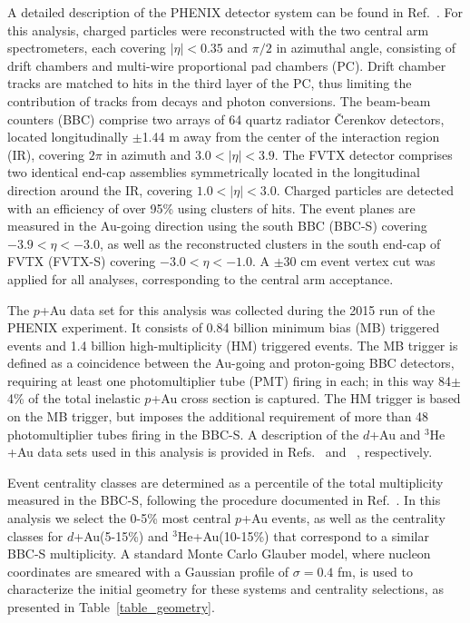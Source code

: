 \documentclass[%
reprint,
showpacs,preprintnumbers,
 amsmath,amssymb,
 aps,
]{revtex4-1}
\newcommand{\dau}{\mbox{$d$+Au}\xspace}
\newcommand{\pau}{\mbox{$p$+Au}\xspace}
\newcommand{\hau}{\mbox{$^3\text{He}$+Au}\xspace}
\newcommand{\bbceta}{\mbox{$3.0<|\eta|<3.9$}\xspace}
\begin{document}
A detailed description of the PHENIX detector system can be found in Ref.~\cite{Adcox2003469}. For this analysis, charged particles were reconstructed with the two central arm spectrometers, each covering $|\eta|<0.35$ and $\pi/2$ in azimuthal angle, consisting of drift chambers and multi-wire proportional pad chambers (PC). Drift chamber tracks are matched to hits in the third layer of the PC, thus limiting the contribution of tracks from decays and photon conversions. The beam-beam counters (BBC) comprise two arrays of 64 quartz radiator \v{C}erenkov detectors, located longitudinally $\pm$1.44 m away from the center of the interaction region (IR), covering $2\pi$ in azimuth and \bbceta. The FVTX detector comprises two identical end-cap assemblies symmetrically located in the longitudinal direction around the IR, covering $1.0 < |\eta| < 3.0$. Charged particles are detected with an efficiency of over 95\% using clusters of hits. The event planes are measured in the Au-going direction using the south BBC (BBC-S) covering $−3.9 < \eta < −3.0$, as well as the reconstructed clusters in the south end-cap of FVTX (FVTX-S) covering $−3.0 < \eta < −1.0$. A $\pm$30 cm event vertex cut was applied for all analyses, corresponding to the central arm acceptance. 

The \pau data set for this analysis was collected during the 2015 run of the PHENIX experiment. It consists of 0.84 billion minimum bias (MB) triggered events and 1.4 billion high-multiplicity (HM) triggered events. The MB trigger is defined as a coincidence between the Au-going and proton-going BBC detectors, requiring at least one photomultiplier tube (PMT) firing in each; in this way 84$\pm$4\% of the total inelastic \pau cross section is captured. The HM trigger is based on the MB trigger, but imposes the additional requirement of more than 48 photomultiplier tubes firing in the BBC-S. A description of the \dau and \hau data sets used in this analysis is provided in Refs.~\cite{adare_measurement_2014} and ~\cite{PhysRevLett.115.142301}, respectively.

Event centrality classes are determined as a percentile of the total multiplicity measured in the BBC-S, following the  procedure documented in Ref.~\cite{bbc}. In this analysis we select the 0-5\% most central \pau events, as well as the centrality classes for \dau (5-15\%) and \hau (10-15\%) that correspond to a similar BBC-S multiplicity. A standard Monte Carlo Glauber model, where nucleon coordinates are smeared with a Gaussian profile of $\sigma = 0.4$ fm, is used to characterize the initial geometry for these systems and centrality selections, as presented in Table~\ref{table_geometry}.
\end{document}
